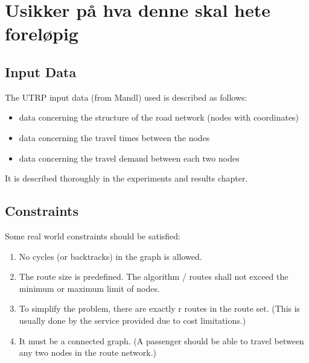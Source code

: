 \section{Usikker på hva denne skal hete foreløpig}

\subsection{Input Data}
The UTRP input data (from Mandl) used is described as follows:
\begin{itemize}
\item data concerning the structure of the road network (nodes with coordinates)
\item data concerning the travel times between the nodes 
\item data concerning the travel demand between each two nodes
\end{itemize}
It is described thoroughly in the experiments and results chapter.

\subsection{Constraints}
Some real world constraints should be satisfied:
\begin{enumerate}
\item \label{itm:constraintCycles} No cycles (or backtracks) in the graph is allowed.
\item \label{itm:constraintRouteSize} The route size is predefined. The algorithm / routes shall not exceed the minimum or maximum limit of nodes.
\item \label{itm:constraintRouteSet} To simplify the problem, there are exactly r routes in the route set. (This is usually done by the service provided due to cost limitations.)
\item \label{itm:criteriaConnectedGraph} It must be a connected graph. (A passenger should be able to travel between any two nodes in the route network.) 
\end{enumerate}

